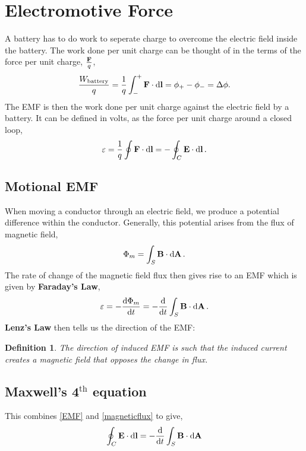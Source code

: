 \documentclass{book}
\newtheorem*{definition}{Definition}
\begin{document}
\section{Electromotive Force}
A battery has to do work to seperate charge to overcome the electric field inside the battery. The work done per unit charge can be thought of in the terms of the force per unit charge, $\frac{\vb{F}}{q}$,
\begin{equation}
    \frac{W_{\text{battery}}}{q} = \frac{1}{q}\int_-^+ \vb{F}\cdot\dd{\vb{l}} = \phi_+ - \phi_- = \Delta \phi. \label{forceperunitchargepotential}
\end{equation}
The EMF is then the work done per unit charge against the electric field by a battery. It can be defined in volts, as the force per unit charge around a closed loop,
\begin{equation}
    \varepsilon = \frac{1}{q}\oint \vb{F}\cdot \dd{\vb{l}} = -\oint_C \vb{E}\cdot\dd{\vb{l}}. \label{EMF}
\end{equation}
\subsection{Motional EMF}
When moving a conductor through an electric field, we produce a potential difference within the conductor. Generally, this potential arises from the flux of magnetic field,
\begin{equation}
    \Phi_m = \int_S \vb{B}\cdot\dd{\vb{A}}. \label{magneticflux}
\end{equation}
The rate of change of the magnetic field flux then gives rise to an EMF which is given by \textbf{Faraday's Law},
\begin{equation}
    \varepsilon = -\dv{\Phi_m}{t} = -\dv{}{t}\int_S\vb{B}\cdot\dd{\vb{A}}.
\end{equation}
\textbf{Lenz's Law} then tells us the direction of the EMF:
\begin{definition}
    The direction of induced EMF is such that the induced current creates a magnetic field that opposes the change in flux.
\end{definition}
\subsection{Maxwell's 4$^{\text{th}}$ equation}
This combines \eqref{EMF} and \eqref{magneticflux} to give,
\begin{equation}
    \oint_C\vb{E}\cdot\dd{\vb{l}} = -\dv{}{t}\int_S\vb{B}\cdot\dd{\vb{A}} \label{maxwell'sfourth}
\end{equation}
\end{document}
